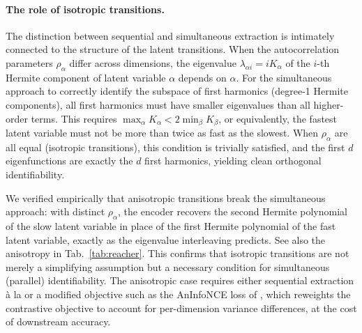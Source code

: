 \paragraph{The role of isotropic transitions.}
The distinction between sequential and simultaneous extraction is intimately connected to the structure of the latent transitions.
When the autocorrelation parameters $\rho_\alpha$ differ across dimensions, the eigenvalue $\lambda_{\alpha i} = i K_\alpha$ of the $i$-th Hermite component of latent variable $\alpha$ depends on $\alpha$.
For the simultaneous approach to correctly identify the subspace of first harmonics (degree-1 Hermite components), all first harmonics must have smaller eigenvalues than all higher-order terms.
This requires $\max_\alpha K_\alpha < 2 \min_\beta K_\beta$, or equivalently, the fastest latent variable must not be more than twice as fast as the slowest.
When $\rho_\alpha$ are all equal (isotropic transitions), this condition is trivially satisfied, and the first $d$ eigenfunctions are exactly the $d$ first harmonics, yielding clean orthogonal identifiability.

We verified empirically that anisotropic transitions break the simultaneous approach: with distinct $\rho_\alpha$, the encoder recovers the second Hermite polynomial of the slow latent variable in place of the first Hermite polynomial of the fast latent variable, exactly as the eigenvalue interleaving predicts. See also the anisotropy in Tab.~\ref{tab:reacher}.
This confirms that isotropic transitions are not merely a simplifying assumption but a necessary condition for simultaneous (parallel) identifiability.
The anisotropic case requires either sequential extraction \`a la \citet{sprekeler2014} or a modified objective such as the AnInfoNCE loss of \citet{rusak2024}, which reweights the contrastive objective to account for per-dimension variance differences, at the cost of downstream accuracy.

